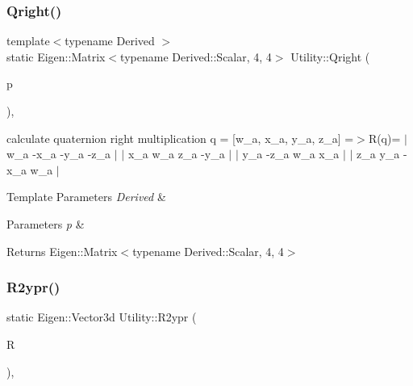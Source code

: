 \subsubsection{\texorpdfstring{Qright()}{Qright()}}
{\footnotesize\ttfamily template$<$typename Derived $>$ \\
static Eigen\+::\+Matrix$<$typename Derived\+::\+Scalar, 4, 4$>$ Utility\+::\+Qright (\begin{DoxyParamCaption}\item[{const Eigen\+::\+Quaternion\+Base$<$ Derived $>$ \&}]{p }\end{DoxyParamCaption})\hspace{0.3cm}{\ttfamily [inline]}, {\ttfamily [static]}}



calculate quaternion right multiplication q = \mbox{[}w\+\_\+a, x\+\_\+a, y\+\_\+a, z\+\_\+a\mbox{]} =$>$R(q)= $\vert$ w\+\_\+a -\/x\+\_\+a -\/y\+\_\+a -\/z\+\_\+a $\vert$ $\vert$ x\+\_\+a w\+\_\+a z\+\_\+a -\/y\+\_\+a $\vert$ $\vert$ y\+\_\+a -\/z\+\_\+a w\+\_\+a x\+\_\+a $\vert$ $\vert$ z\+\_\+a y\+\_\+a -\/x\+\_\+a w\+\_\+a $\vert$ 


\begin{DoxyTemplParams}{Template Parameters}
{\em Derived} & \\
\hline
\end{DoxyTemplParams}

\begin{DoxyParams}{Parameters}
{\em p} & \\
\hline
\end{DoxyParams}
\begin{DoxyReturn}{Returns}
Eigen\+::\+Matrix$<$typename Derived\+::\+Scalar, 4, 4$>$ 
\end{DoxyReturn}
\mbox{\label{classUtility_a9a4d4e66c5288c4a8fb5d2e6a0faf840}} 
\subsubsection{\texorpdfstring{R2ypr()}{R2ypr()}}
{\footnotesize\ttfamily static Eigen\+::\+Vector3d Utility\+::\+R2ypr (\begin{DoxyParamCaption}\item[{const Eigen\+::\+Matrix3d \&}]{R }\end{DoxyParamCaption})\hspace{0.3cm}{\ttfamily [inline]}, {\ttfamily [static]}}



